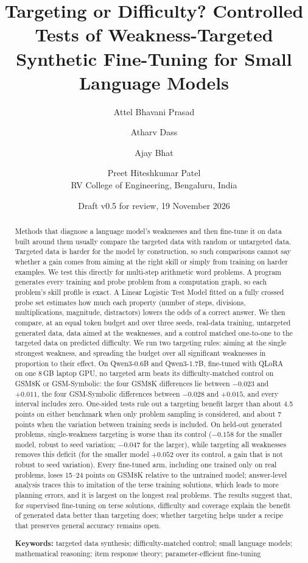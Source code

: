 \documentclass[11pt]{article}
\title{Targeting or Difficulty? Controlled Tests of Weakness-Targeted\\
Synthetic Fine-Tuning for Small Language Models}
\author{Attel Bhavani Prasad \and Atharv Dass \and Ajay Bhat \and Preet Hiteshkumar Patel\\[4pt]
\small RV College of Engineering, Bengaluru, India\\[2pt]
\small \todo{corresponding author and e-mail}}
\date{Draft v0.5 for review, 19 November 2026}
\begin{document}
\maketitle

\begin{abstract}
Methods that diagnose a language model's weaknesses and then fine-tune it on data built around them usually compare
the targeted data with random or untargeted data. Targeted data is harder for the model by construction, so such
comparisons cannot say whether a gain comes from aiming at the right skill or simply from training on harder
examples. We test this directly for multi-step arithmetic word problems. A program generates every training and probe
problem from a computation graph, so each problem's skill profile is exact. A Linear Logistic Test Model fitted on a
fully crossed probe set estimates how much each property (number of steps, divisions, multiplications, magnitude,
distractors) lowers the odds of a correct answer. We then compare, at an equal token budget and over three seeds,
real-data training, untargeted generated data, data aimed at the weaknesses, and a control matched one-to-one to the
targeted data on predicted difficulty. We run two targeting rules: aiming at the single strongest weakness, and
spreading the budget over all significant weaknesses in proportion to their effect. On Qwen3-0.6B and Qwen3-1.7B,
fine-tuned with QLoRA on one 8\,GB laptop GPU, no targeted arm beats its difficulty-matched control on GSM8K or
GSM-Symbolic: the four GSM8K differences lie between $-0.023$ and $+0.011$, the four GSM-Symbolic differences between
$-0.028$ and $+0.015$, and every interval includes zero. One-sided tests rule out a targeting benefit larger than about
4.5 points on either benchmark when only problem sampling is considered, and about 7 points when the variation between
training seeds is included. On held-out generated problems, single-weakness targeting is worse than its control
($-0.158$ for the smaller model, robust to seed variation; $-0.047$ for the larger), while targeting all weaknesses
removes this deficit (for the smaller model $+0.052$ over its control, a gain that is not robust to seed variation). Every fine-tuned arm,
including one trained only on real problems, loses 15--24 points on GSM8K relative to the untrained model;
answer-level analysis traces this to imitation of the terse training solutions, which leads to more planning errors,
and it is largest on the longest real problems. The results suggest that, for supervised fine-tuning on terse
solutions, difficulty and coverage explain the benefit of generated data better than targeting does; whether targeting
helps under a recipe that preserves general accuracy remains open.

\medskip\noindent\textbf{Keywords:} targeted data synthesis; difficulty-matched control; small language models;
mathematical reasoning; item response theory; parameter-efficient fine-tuning
\end{abstract}
\end{document}
